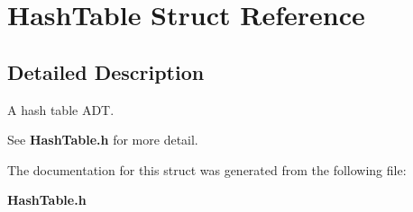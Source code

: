 \section{Hash\-Table Struct Reference}
\label{structHashTable}


\subsection{Detailed Description}
A hash table ADT. 

See {\bf Hash\-Table.h} for more detail. 



The documentation for this struct was generated from the following file:\begin{CompactItemize}
\item 
{\bf Hash\-Table.h}\end{CompactItemize}
